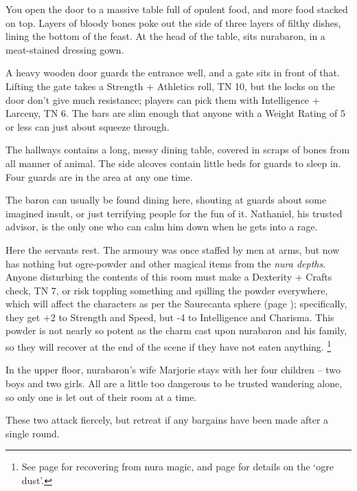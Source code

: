 \begin{multicols}{2}
\begin{boxtext}
	You open the door to a massive table full of opulent food, and more food stacked on top.  Layers of bloody bones poke out the side of three layers of filthy dishes, lining the bottom of the feast.  At the head of the table, sits \gls{nurabaron}, in a meat-stained dressing gown.

\end{boxtext}

A heavy wooden door guards the entrance well, and a gate sits in front of that.  Lifting the gate takes a Strength + Athletics roll, TN 10, but the locks on the door don't give much resistance; players can pick them with Intelligence + Larceny, TN 6.  The bars are slim enough that anyone with a Weight Rating of 5 or less can just about squeeze through.

The hallways contains a long, messy dining table, covered in scraps of bones from all manner of animal.  The side alcoves contain little beds for guards to sleep in.  Four guards are in the area at any one time.

The baron can usually be found dining here, shouting at guards about some imagined insult, or just terrifying people for the fun of it.  Nathaniel, his trusted advisor, is the only one who can calm him down when he gets into a rage.


Here the servants rest.
The armoury was once staffed by men at arms, but now has nothing but ogre-powder and other magical items from the \textit{nura depths}.
Anyone disturbing the contents of this room must make a Dexterity + Crafts check, TN 7, or risk toppling something and spilling the powder everywhere, which will affect the characters as per the Saurecanta sphere (page \pageref{saurecanta}); specifically, they get +2 to Strength and Speed, but -4 to Intelligence and Charisma.
This powder is not nearly so potent as the charm cast upon \gls{nurabaron} and his family, so they will recover at the end of the scene if they have not eaten anything.
\footnote{See page \pageref{nura_recovery} for recovering from nura magic, and page \pageref{ogredust} for details on the `ogre dust'.}


In the upper floor, \gls{nurabaron}'s wife Marjorie stays with her four children -- two boys and two girls.  All are a little too dangerous to be trusted wandering alone, so only one is let out of their room at a time.

These two attack fiercely, but retreat if any bargains have been made after a single round.


\end{multicols}

